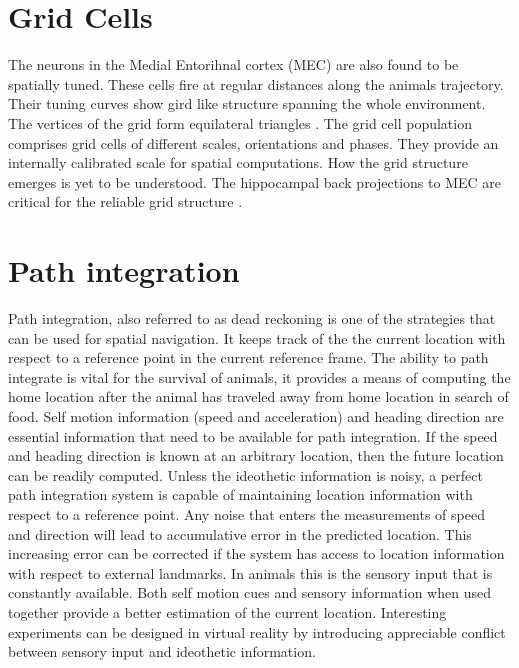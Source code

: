 \section{Grid Cells}
The neurons in the Medial Entorihnal cortex (MEC) are also found to be spatially tuned. These cells fire at regular distances along the animals trajectory. Their tuning curves show gird like structure spanning the whole environment. The vertices of the grid form equilateral triangles \cite{Hafting2005}. The grid cell population comprises grid cells of different scales, orientations and phases. They provide an internally  calibrated scale for spatial computations. How the grid structure emerges is yet to be understood. The hippocampal back projections to MEC are critical for the reliable grid structure \cite{Bonnevie2013}. 

\section{Path integration}
\label{pathIntgr}
Path integration, also referred to as dead reckoning is one of the strategies that can be used for spatial navigation. It keeps track of the the current location with respect to a reference point in the current reference frame. The ability to path integrate is vital for the survival of animals, it provides a means of computing the home location after the animal has traveled away from home location in search of food.
Self motion information (speed and acceleration) and heading direction are essential information that need to be available for path integration. If the speed and heading direction is known at an arbitrary location, then the future location can be readily computed. Unless the ideothetic information is noisy, a perfect path integration system is capable of maintaining location information with respect to a reference point. Any noise that enters the measurements of speed and direction will lead to accumulative error in the predicted location. This increasing error can be corrected if the system has access to location information with respect to external landmarks. In animals this is the sensory input that is constantly available. Both self motion cues and sensory information when used together provide a better estimation of the current location. Interesting experiments can be designed in virtual reality by introducing appreciable conflict between sensory input and ideothetic information. 

